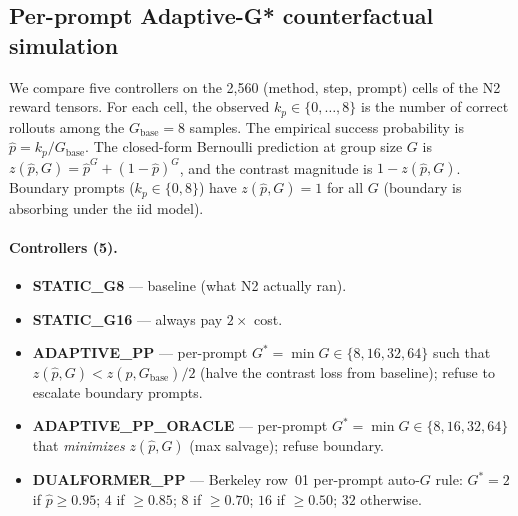 \label{sec:p7-iter131-per-prompt-adaptive-gstar}
%
%

\subsection*{Per-prompt Adaptive-G* counterfactual simulation}

We compare five controllers on the 2,560 (method, step, prompt) cells of
the N2 reward tensors. For each cell, the observed $k_p \in \{0, \ldots, 8\}$
is the number of correct rollouts among the $G_{\mathrm{base}}{=}8$ samples.
The empirical success probability is $\hat{p} = k_p / G_{\mathrm{base}}$.
The closed-form Bernoulli prediction at group size $G$ is
$z(\hat{p}, G) = \hat{p}^G + (1-\hat{p})^G$, and the contrast magnitude is
$1 - z(\hat{p}, G)$. Boundary prompts ($k_p \in \{0, 8\}$) have
$z(\hat{p}, G) = 1$ for all $G$ (boundary is absorbing under the iid model).

\paragraph{Controllers (5).}

\begin{itemize}
\item \textbf{STATIC\_G8} — baseline (what N2 actually ran).
\item \textbf{STATIC\_G16} — always pay $2\times$ cost.
\item \textbf{ADAPTIVE\_PP} — per-prompt $G^* = \min G \in \{8,16,32,64\}$
      such that $z(\hat{p}, G) < z(\hat{p}, G_{\mathrm{base}}) / 2$
      (halve the contrast loss from baseline); refuse to escalate boundary
      prompts.
\item \textbf{ADAPTIVE\_PP\_ORACLE} — per-prompt $G^* = \min G \in \{8,16,32,64\}$
      that \emph{minimizes} $z(\hat{p}, G)$ (max salvage); refuse boundary.
\item \textbf{DUALFORMER\_PP} — Berkeley row~01 per-prompt auto-$G$ rule:
      $G^*=2$ if $\hat{p}\geq 0.95$; $4$ if $\geq 0.85$; $8$ if $\geq 0.70$;
      $16$ if $\geq 0.50$; $32$ otherwise.
\end{itemize}

